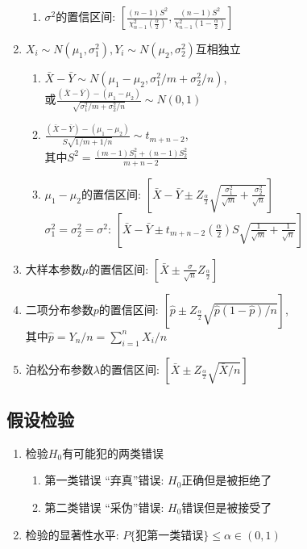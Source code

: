 \begin{enumerate}
\begin{enumerate}
\item $\sigma^2$的置信区间: $[\frac{(n-1)S^2}{\chi_{n-1}^2(\frac{\alpha}{2})},\frac{(n-1)S^2}{\chi_{n-1}^2(1-\frac{\alpha}{2})}]$
\end{enumerate}
\item $X_i\sim N(\mu_1,\sigma_1^2), Y_i\sim N(\mu_2,\sigma_2^2)$互相独立
\begin{enumerate}
\item $\bar{X}-\bar{Y}\sim N(\mu_1-\mu_2,\sigma_1^2/m+\sigma_2^2/n)$,\\
或$\frac{(\bar{X}-\bar{Y})-(\mu_1-\mu_2)}{\sqrt{\sigma_1^2/m+\sigma_2^2/n}}\sim N(0,1)$
\item $\frac{(\bar{X}-\bar{Y})-(\mu_1-\mu_2)}{S\sqrt{1/m+1/n}}\sim t_{m+n-2}$,\\
其中$S^2=\frac{(m-1)S_1^2+(n-1)S_2^2}{m+n-2}$
\item $\mu_1-\mu_2$的置信区间: $[\bar{X}-\bar{Y}\pm Z_{\frac{\alpha}{2}}\sqrt{\frac{\sigma_1^2}{\sqrt{m}}+\frac{\sigma_2^2}{\sqrt{n}}}]$\\
$\sigma_1^2=\sigma_2^2=\sigma^2$: $[\bar{X}-\bar{Y}\pm t_{m+n-2}{(\frac{\alpha}{2})}S\sqrt{\frac{1}{\sqrt{m}}+\frac{1}{\sqrt{n}}}]$
\end{enumerate}
\item 大样本参数$\mu$的置信区间: $[\bar{X}\pm\frac{\sigma}{\sqrt{n}}Z_{\frac{\alpha}{2}}]$
\item 二项分布参数$p$的置信区间: $[\hat{p}\pm Z_{\frac{\alpha}{2}}\sqrt{\hat{p}(1-\hat{p})/n}]$,\\
其中$\hat{p}=Y_n/n=\sum_{i=1}^n X_i/n$
\item 泊松分布参数$\lambda$的置信区间: $[\bar{X}\pm Z_{\frac{\alpha}{2}}\sqrt{\bar{X}/n}]$
\end{enumerate}

\subsection{假设检验}

\begin{enumerate}
\item 检验$H_0$有可能犯的两类错误
\begin{enumerate}
\item 第一类错误 “弃真”错误: $H_0$正确但是被拒绝了
\item 第二类错误 “采伪”错误: $H_0$错误但是被接受了
\end{enumerate}
\item 检验的显著性水平: $P\{\text{犯第一类错误}\}\le\alpha\in(0,1)$
\end{enumerate}

